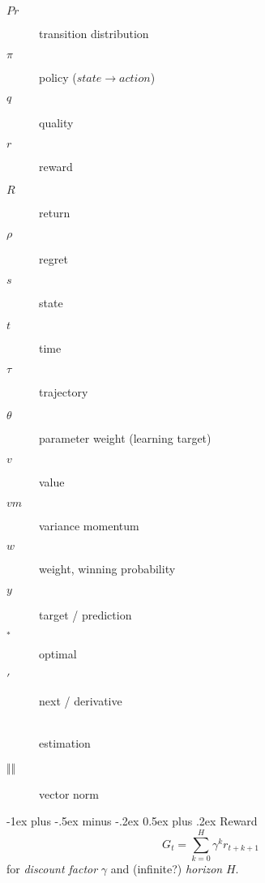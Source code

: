 \documentclass[10pt,landscape]{article}
\makeatletter
\renewcommand{\section}{\@startsection{section}{1}{0mm}%
    {-1ex plus -.5ex minus -.2ex}%
    {0.5ex plus .2ex}%
    {\normalfont\large\bfseries}}
\makeatother
\begin{document}
\begin{multicols}{3}
\begin{description}
    \item[$Pr$]
    transition distribution
    \item[$\pi$]
    policy ($state \rightarrow action$)
    \item[$q$]
    quality
    \item[$r$]
    reward
    \item[$R$]
    return
    \item[$\rho$]
    regret
    \item[$s$]
    state
    \item[$t$]
    time %
    \item[$\tau$]
    trajectory
    \item[$\theta$]
    parameter weight (learning target) %
    \item[$v$]
    value
    \item[$vm$]
    variance momentum
    \item[$w$]
    weight, winning probability
    \item[$y$]
    target / prediction %
    \item[$_\ast$]
    optimal
    \item[$'$]
    next / derivative
    \item[$\hat{}$]
    estimation
    \item[$\Vert\Vert$]
    vector norm
\end{description}

\section{Reward}
\begin{equation}
    G_t = \sum_{k = 0}^H \gamma^kr_{t + k + 1}
    \label{eq: total_reward}
\end{equation}
for \emph{discount factor} $\gamma$ and (infinite?) \emph{horizon} $H$.


\end{multicols}
\end{document}
